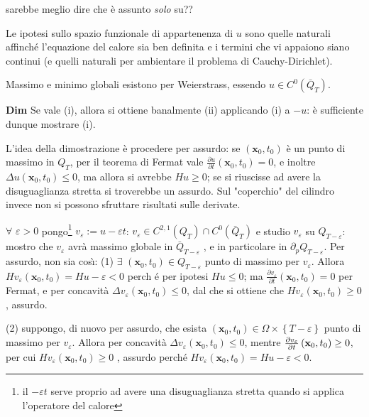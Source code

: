 \documentclass{article}
\begin{document}
sarebbe meglio dire che \`{e} assunto \textit{solo} su??

Le ipotesi sullo spazio funzionale di appartenenza di $u$ sono quelle
naturali affinch\'{e} l'equazione del calore sia ben definita e i termini
che vi appaiono siano continui (e quelli naturali per ambientare il problema
di Cauchy-Dirichlet).

Massimo e minimo globali esistono per Weierstrass, essendo $u\in C^{0}\left( 
\bar{Q}_{T}\right) $.

\textbf{Dim} Se vale (i), allora si ottiene banalmente (ii) applicando (i) a 
$-u$: \`{e} sufficiente dunque mostrare (i).

L'idea della dimostrazione \`{e} procedere per assurdo: se $\left( \mathbf{x}%
_{0}\mathbf{,}t_{0}\right) $ \`{e} un punto di massimo in $Q_{T}$, per il
teorema di Fermat vale $\frac{\partial u}{\partial t}\left( \mathbf{x}%
_{0},t_{0}\right) =0$, e inoltre $\Delta u\left( \mathbf{x}_{0},t_{0}\right)
\leq 0$, ma allora si avrebbe $Hu\geq 0$; se si riuscisse ad avere la
disuguaglianza stretta si troverebbe un assurdo. Sul "coperchio" del
cilindro invece non si possono sfruttare risultati sulle derivate.

$\forall $ $\varepsilon >0$ pongo\footnote{%
il $-\varepsilon t$ serve proprio ad avere una disuguaglianza stretta quando
si applica l'operatore del calore} $v_{\varepsilon }:=u-\varepsilon t$: $%
v_{\varepsilon }\in C^{2,1}\left( Q_{T}\right) \cap C^{0}\left( \bar{Q}%
_{T}\right) $ e studio $v_{\varepsilon }$ su $Q_{T-\varepsilon }$: mostro
che $v_{\varepsilon }$ avr\`{a} massimo globale in $\bar{Q}_{T-\varepsilon }$%
, e in particolare in $\partial _{p}Q_{T-\varepsilon }$. Per assurdo, non
sia cos\`{\i}: (1) $\exists $ $\left( \mathbf{x}_{0},t_{0}\right) \in
Q_{T-\varepsilon }$ punto di massimo per $v_{\varepsilon }$. Allora $%
Hv_{\varepsilon }\left( \mathbf{x}_{0},t_{0}\right) =Hu-\varepsilon <0$ perch%
\'{e} per ipotesi $Hu\leq 0$; ma $\frac{\partial v_{\varepsilon }}{\partial t%
}\left( \mathbf{x}_{0},t_{0}\right) =0$ per Fermat, e per concavit\`{a} $%
\Delta v_{\varepsilon }\left( \mathbf{x}_{0},t_{0}\right) \leq 0$, dal che
si ottiene che $Hv_{\varepsilon }\left( \mathbf{x}_{0},t_{0}\right) \geq 0$,
assurdo.

(2) suppongo, di nuovo per assurdo, che esista $\left( \mathbf{x}%
_{0},t_{0}\right) \in \Omega \times \left\{ T-\varepsilon \right\} $ punto
di massimo per $v_{\varepsilon }$. Allora per concavit\`{a} $\Delta
v_{\varepsilon }\left( \mathbf{x}_{0},t_{0}\right) \leq 0$, mentre $\frac{%
\partial v_{\varepsilon }}{\partial t}\left( \mathbf{x}_{0},t_{0}\right)
\geq 0$, per cui $Hv_{\varepsilon }\left( \mathbf{x}_{0},t_{0}\right) \geq 0$%
, assurdo perch\'{e} $Hv_{\varepsilon }\left( \mathbf{x}_{0},t_{0}\right)
=Hu-\varepsilon <0$.
\end{document}
